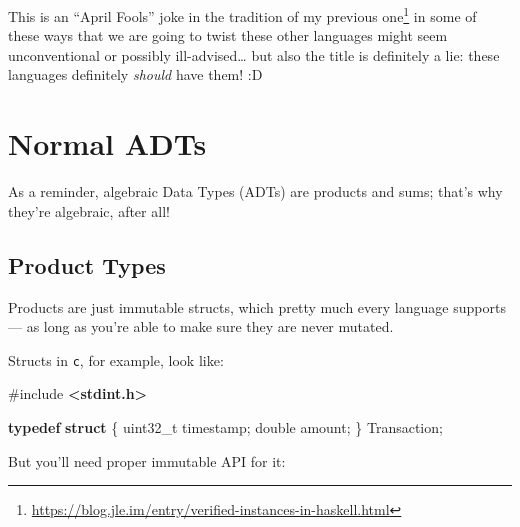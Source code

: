 \documentclass[]{article}
\newenvironment{Shaded}{}{}
\newcommand{\DataTypeTok}[1]{\textcolor[rgb]{0.56,0.13,0.00}{#1}}
\newcommand{\ImportTok}[1]{\textcolor[rgb]{0.00,0.50,0.00}{\textbf{#1}}}
\newcommand{\KeywordTok}[1]{\textcolor[rgb]{0.00,0.44,0.13}{\textbf{#1}}}
\newcommand{\NormalTok}[1]{#1}
\newcommand{\OperatorTok}[1]{\textcolor[rgb]{0.40,0.40,0.40}{#1}}
\newcommand{\PreprocessorTok}[1]{\textcolor[rgb]{0.74,0.48,0.00}{#1}}
\renewcommand{\href}[2]{#2\footnote{\url{#1}}}
\begin{document}
This is an ``April Fools'' joke in the tradition of
\href{https://blog.jle.im/entry/verified-instances-in-haskell.html}{my previous
one} in some of these ways that we are going to twist these other languages
might seem unconventional or possibly ill-advised\ldots{} but also the title is
definitely a lie: these languages definitely \emph{should} have them! :D

\section{Normal ADTs}\label{normal-adts}

As a reminder, algebraic Data Types (ADTs) are products and sums; that's why
they're algebraic, after all!

\subsection{Product Types}\label{product-types}

Products are just immutable structs, which pretty much every language supports
--- as long as you're able to make sure they are never mutated.

Structs in \texttt{c}, for example, look like:

\begin{Shaded}
\begin{Highlighting}[]
\PreprocessorTok{\#include }\ImportTok{\textless{}stdint.h\textgreater{}}

\KeywordTok{typedef} \KeywordTok{struct} \OperatorTok{\{}
    \DataTypeTok{uint32\_t}\NormalTok{ timestamp}\OperatorTok{;}
    \DataTypeTok{double}\NormalTok{ amount}\OperatorTok{;}
\OperatorTok{\}}\NormalTok{ Transaction}\OperatorTok{;}
\end{Highlighting}
\end{Shaded}

But you'll need proper immutable API for it:
\end{document}
